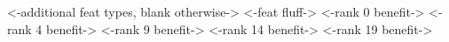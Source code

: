 { <-additional feat types, blank otherwise-> }
{ <-feat fluff-> }
{ <-rank 0 benefit-> }
{ <-rank 4 benefit-> }
{ <-rank 9 benefit-> }
{ <-rank 14 benefit-> }
{ <-rank 19 benefit-> }